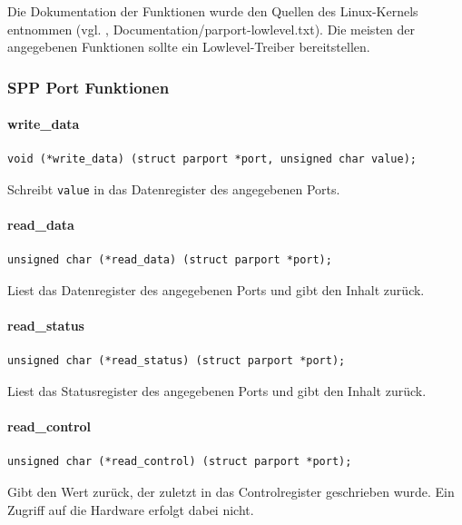 \documentclass[a4paper,11pt]{article}
\begin{document}
Die Dokumentation der Funktionen wurde den Quellen des Linux-Kernels entnommen 
(vgl. \cite{net:2}, Documentation/parport-lowlevel.txt). Die meisten der angegebenen Funktionen
sollte ein Lowlevel-Treiber bereitstellen.

\subsubsection{SPP Port Funktionen}

\paragraph{write\_data}

\begin{verbatim}
void (*write_data) (struct parport *port, unsigned char value);
\end{verbatim}

Schreibt \verb|value| in das Datenregister des angegebenen Ports.

\paragraph{read\_data}

\begin{verbatim}
unsigned char (*read_data) (struct parport *port);
\end{verbatim}

Liest das Datenregister des angegebenen Ports und gibt den Inhalt zurück.

\paragraph{read\_status}

\begin{verbatim}
unsigned char (*read_status) (struct parport *port);
\end{verbatim}

Liest das Statusregister des angegebenen Ports und gibt den Inhalt zurück.

\paragraph{read\_control}

\begin{verbatim}
unsigned char (*read_control) (struct parport *port);
\end{verbatim}

Gibt den Wert zurück, der zuletzt in das Controlregister geschrieben wurde. Ein Zugriff
auf die Hardware erfolgt dabei nicht.
\end{document}

